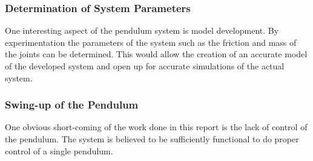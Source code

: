 \subsubsection{Determination of System Parameters} %
\label{ssub:determination_of_system_parameters}
One interesting aspect of the pendulum system is model development.
By experimentation the parameters of the system such as the friction and mass of the joints can be determined.
This would allow the creation of an accurate model of the developed system and open up for accurate simulations of the actual system.

\subsubsection{Swing-up of the Pendulum} %
\label{ssub:swing_up_of_the_pendulum}
One obvious short-coming of the work done in this report is the lack of control of the pendulum.
The system is believed to be sufficiently functional to do proper control of a single pendulum.
